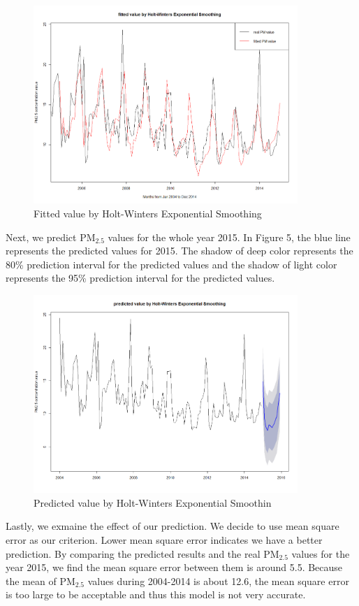 \documentclass[10pt]{article}
\begin{document}
\begin{figure}[H]
\centering
\includegraphics[width = 100mm]{ts2.png}
\caption{Fitted value by Holt-Winters Exponential Smoothing}
\end{figure}

Next, we predict PM$_{2.5}$ values for the whole year 2015. In Figure 5, the
blue line represents the predicted values for 2015. The shadow of deep color
represents the 80\% prediction interval for the predicted values and the shadow
of light color represents the 95\% prediction interval for the predicted
values.

\begin{figure}[H]
\centering
\includegraphics[width = 100mm]{ts3.png}
\caption{Predicted value by Holt-Winters Exponential Smoothin}
\end{figure}

Lastly, we exmaine the effect of our prediction. We decide to use mean square
error as our criterion. Lower mean square error indicates we have a better
prediction. By comparing the predicted results and the real PM$_{2.5}$ values for the
year 2015, we find the mean square error between them is around 5.5. Because
the mean of PM$_{2.5}$ values during 2004-2014 is about 12.6, the mean square
error is too large to be acceptable and thus this model is not very accurate.
\end{document}
